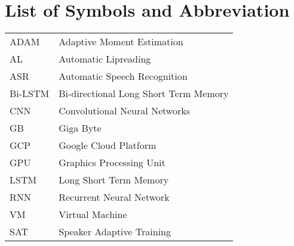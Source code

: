 		\break


		\tableofcontents
		
		\listoftables
		\break
		\pagebreak

		\listoffigures
		\break
	
	
	
		\Large
			\begingroup
				\let\clearpage\relax
				\chapter*{List of Symbols and Abbreviation}
			\endgroup
		\normalsize

            \begin{tabular}{p{2cm} p{10cm}}
                ADAM & Adaptive Moment Estimation\\
                AL & Automatic Lipreading \\
                ASR & Automatic Speech Recognition \\
                Bi-LSTM & Bi-directional Long Short Term Memory\\
                CNN & Convolutional Neural Networks \\
                GB & Giga Byte\\
                GCP & Google Cloud Platform\\
                GPU & Graphics Processing Unit\\
                LSTM & Long Short Term Memory\\
                RNN & Recurrent Neural Network\\
                VM & Virtual Machine\\
                SAT & Speaker Adaptive Training \\

            \end{tabular}
		\break
		\pagebreak